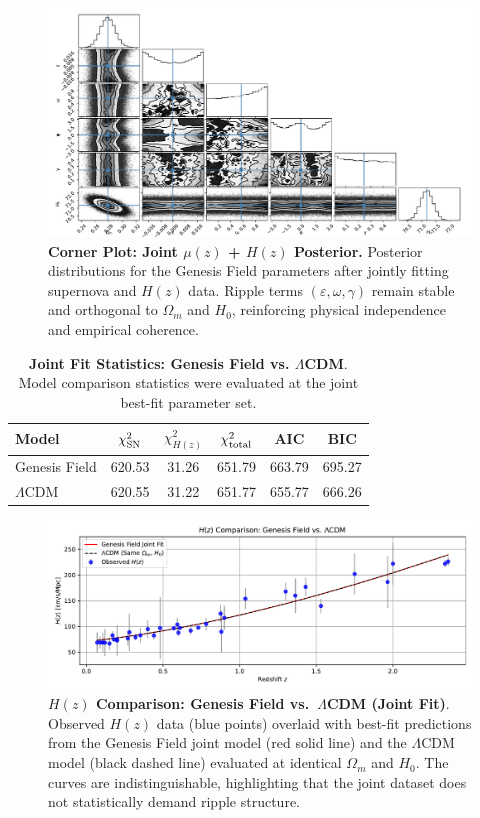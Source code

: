 \begin{figure}[htpb]
\centering
\includegraphics[width=\textwidth]{figures/joint_mcmc.pdf}
\caption{\textbf{Corner Plot: Joint $\mu(z)$ + $H(z)$ Posterior.} Posterior distributions for the Genesis Field parameters after jointly fitting supernova and $H(z)$ data. Ripple terms $(\varepsilon, \omega, \gamma)$ remain stable and orthogonal to $\Omega_m$ and $H_0$, reinforcing physical independence and empirical coherence.}
\label{fig:joint_corner}
\end{figure}

\begin{table}[htpb]
\centering
\caption{\textbf{Joint Fit Statistics: Genesis Field vs. $\Lambda$CDM}. Model comparison statistics were evaluated at the joint best-fit parameter set.}
\vspace{0.5em}
\begin{tabular}{lccccc}
\hline
\textbf{Model} & $\chi^2_{\rm SN}$ & $\chi^2_{H(z)}$ & $\chi^2_{\rm total}$ & AIC & BIC \\
\hline
Genesis Field & 620.53 & 31.26 & 651.79 & 663.79 & 695.27 \\
$\Lambda$CDM  & 620.55 & 31.22 & 651.77 & 655.77 & 666.26 \\
\hline
\end{tabular}
\label{tab:joint_stats}
\end{table}

\begin{figure}[htpb]
\centering
\includegraphics[width=\textwidth]{figures/joint_hz_comparison.pdf}
\caption{\textbf{$H(z)$ Comparison: Genesis Field vs.\ $\Lambda$CDM (Joint Fit)}. Observed $H(z)$ data (blue points) overlaid with best-fit predictions from the Genesis Field joint model (red solid line) and the $\Lambda$CDM model (black dashed line) evaluated at identical $\Omega_m$ and $H_0$. The curves are indistinguishable, highlighting that the joint dataset does not statistically demand ripple structure.}
\label{fig:Hz_comparison}
\end{figure}

